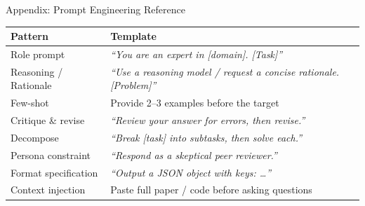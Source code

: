 \documentclass[aspectratio=169, 10pt]{beamer}
\begin{document}












\appendix


\begin{frame}{Appendix: Prompt Engineering Reference}
  \small
  \begin{tabularx}{\textwidth}{lX}
    \toprule
    \textbf{Pattern} & \textbf{Template} \\
    \midrule
    Role prompt & \textit{``You are an expert in [domain]. [Task]''} \\
    Reasoning / Rationale & \textit{``Use a reasoning model / request a concise rationale. [Problem]''} \\
    Few-shot & Provide 2--3 examples before the target \\
    Critique \& revise & \textit{``Review your answer for errors, then revise.''} \\
    Decompose & \textit{``Break [task] into subtasks, then solve each.''} \\
    Persona constraint & \textit{``Respond as a skeptical peer reviewer.''} \\
    Format specification & \textit{``Output a JSON object with keys: \ldots''} \\
    Context injection & Paste full paper / code before asking questions \\
    \bottomrule
  \end{tabularx}
\end{frame}
\end{document}
